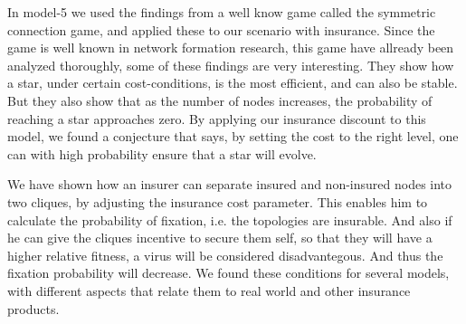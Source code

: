 In model-5 we used the findings from a well know game called the symmetric connection game, and applied these to our scenario with insurance. Since the game is well known in network formation research, this game have allready been analyzed thoroughly, some of these findings are very interesting. They show how a star, under certain cost-conditions, is the most efficient, and can also be stable. But they also show that as the number of nodes increases, the probability of reaching a star approaches zero.
By applying our insurance discount to this model, we found a conjecture that says, by setting the cost to the right level, one can with high probability ensure that a star will evolve.

We have shown how an insurer can separate insured and non-insured nodes into two cliques, by adjusting the insurance cost parameter. This enables him to calculate the probability of fixation, i.e. the topologies are insurable. And also if he can give the cliques incentive to secure them self, so that they will have a higher relative fitness, a virus will be considered disadvantegous. And thus the fixation probability will decrease. 
We found these conditions for several models, with different aspects that relate them to real world and other insurance products.

